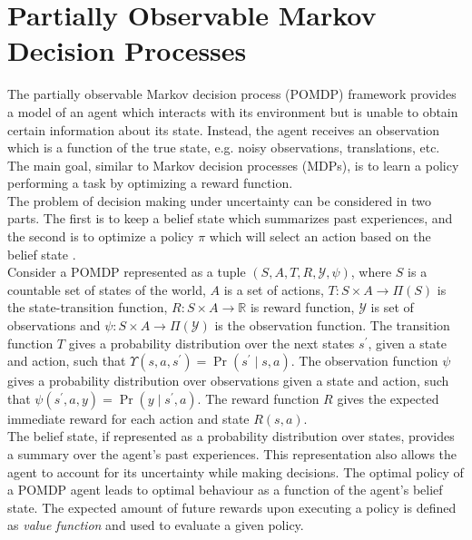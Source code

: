 \section{Partially Observable Markov Decision Processes}
\label{sec:belief_POMDP}
The partially observable Markov decision process (POMDP) framework provides a model of an agent which interacts with its environment but is unable to obtain certain information about its state. Instead, the agent receives an observation which is a function of the true state, e.g. noisy observations, translations, etc. The main goal, similar to Markov decision processes (MDPs), is to learn a policy performing a task by optimizing a reward function. \\
The problem of decision making under uncertainty can be considered in two parts. The first is to keep a belief state which summarizes past experiences, and the second is to optimize a policy $ \pi $ which will select an action based on the belief state \cite{KAELBLING199899,Murphy2000}.\\
Consider a POMDP represented as a tuple $ (S, A, T, R, \mathcal{Y}, \psi) $, where $ S $ is a countable set of states of the world, $ A $ is a set of actions, $ T: S \times A \rightarrow \varPi(S) $ is the state-transition function, $ R: S\times A \rightarrow \mathbb{R} $ is reward function, $ \mathcal{Y} $ is set of observations and $ \psi:S\times A \rightarrow \varPi(\mathcal{Y})$ is the observation function. The transition function $ T $ gives a probability distribution over the next states $ s^\prime $, given a state and action, such that $ \Upsilon(s, a, s^\prime) = \operatorname{Pr}(s^\prime \mid s, a) $. The observation function $ \psi $ gives a probability distribution over observations given a state and action, such that $ \psi(s^\prime, a, y) = \operatorname{Pr}(y \mid s^\prime, a) $. The reward function $ R $ gives the expected immediate reward for each action and state $ R(s,a) $.\\
The belief state, if represented as a probability distribution over states, provides a summary over the agent's past experiences. This representation also allows the agent to account for its uncertainty while making decisions. The optimal policy of a POMDP agent leads to optimal behaviour as a function of the agent's belief state. %
The expected amount of future rewards upon executing a policy is defined as \textit{value function} and used to evaluate a given policy. \\%
